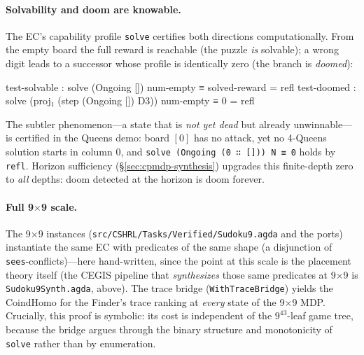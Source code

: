 \documentclass[9pt,a4paper]{article}
\newcommand{\fpath}[1]{\nolinkurl{#1}}
\theoremstyle{plain}
\theoremstyle{definition}
\theoremstyle{remark}
\begin{document}
\paragraph{Solvability and doom are knowable.}  The EC's capability profile \texttt{solve} certifies both directions computationally.  From the empty board the full reward is reachable (the puzzle \emph{is} solvable); a wrong digit leads to a successor whose profile is identically zero (the branch is \emph{doomed}):
\begin{spec}
test-solvable : solve (Ongoing []) num-empty ≡ solved-reward   = refl
test-doomed   : solve (proj₁ (step (Ongoing []) D3)) num-empty ≡ 0 = refl
\end{spec}
The subtler phenomenon---a state that is \emph{not yet dead} but already unwinnable---is certified in the Queens demo: board $[0]$ has no attack, yet no 4-Queens solution starts in column 0, and \texttt{solve (Ongoing (0 ∷ [])) N ≡ 0} holds by \texttt{refl}.  Horizon sufficiency (\S\ref{sec:cpmdp-synthesis}) upgrades this finite-depth zero to \emph{all} depths: doom detected at the horizon is doom forever.

\paragraph{Full 9$\times$9 scale.}  The 9$\times$9 instances (\fpath{src/CSHRL/Tasks/Verified/Sudoku9.agda} and the ports) instantiate the same EC with predicates of the same shape (a disjunction of \texttt{sees}-conflicts)---here hand-written, since the point at this scale is the placement theory itself (the CEGIS pipeline that \emph{synthesizes} those same predicates at 9$\times$9 is \fpath{Sudoku9Synth.agda}, above).  The trace bridge (\texttt{WithTraceBridge}) yields the CoindHomo for the Finder's trace ranking at \emph{every} state of the 9$\times$9 MDP.  Crucially, this proof is symbolic: its cost is independent of the $9^{43}$-leaf game tree, because the bridge argues through the binary structure and monotonicity of \texttt{solve} rather than by enumeration.
\end{document}
